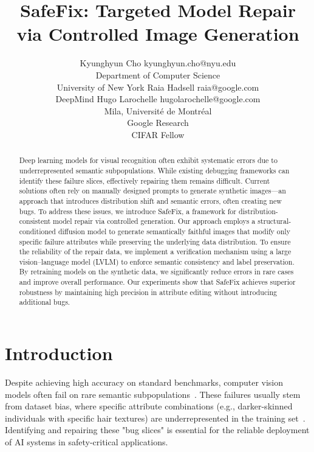 \documentclass[10pt]{article} %
\title{SafeFix: Targeted Model Repair via Controlled Image Generation}
\author{\name Kyunghyun Cho \email kyunghyun.cho@nyu.edu \\
      \addr Department of Computer Science\\
      University of New York
      \AND
      \name Raia Hadsell \email raia@google.com \\
      \addr DeepMind
      \AND
      \name Hugo Larochelle \email hugolarochelle@google.com\\
      \addr Mila, Universit\'e de Montr\'eal \\
      Google Research\\
      CIFAR Fellow}
\newcommand{\model}{SafeFix\xspace}
\begin{document}
\maketitle

\begin{abstract}
Deep learning models for visual recognition often exhibit systematic errors due to underrepresented semantic subpopulations. While existing debugging frameworks can identify these failure slices, effectively repairing them remains difficult. Current solutions often rely on manually designed prompts to generate synthetic images—an approach that introduces distribution shift and semantic errors, often creating new bugs. To address these issues, we introduce \model, a framework for distribution-consistent model repair via controlled  generation. Our approach employs a structural-conditioned diffusion model to generate semantically faithful images that modify only specific failure attributes while preserving the underlying data distribution. To ensure the reliability of the repair data, we implement a  verification mechanism using a large vision--language model (LVLM) to enforce semantic consistency and label preservation. By retraining models on the synthetic data, we significantly reduce errors in rare cases and improve overall performance. Our experiments show that \model achieves superior robustness by maintaining high precision in attribute editing without introducing additional bugs.
\end{abstract}

\section{Introduction}
Despite achieving high accuracy on standard benchmarks, computer vision models often fail on rare semantic subpopulations~\citep{barbu2019objectnet,gao2023adaptive,leclerc20223db}. These failures usually stem from dataset bias, where specific attribute combinations (e.g., darker-skinned individuals with specific hair textures) are underrepresented in the training set~\citep{buolamwini2018gender}. Identifying and repairing these "bug slices" is essential for the reliable deployment of AI systems in safety-critical applications.
\end{document}
